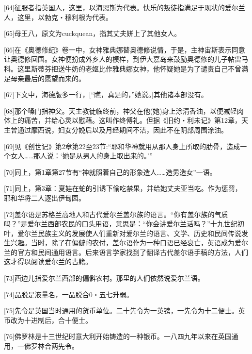 \documentclass{article}
\begin{document}
[64]征服者指英国人，这里，以海恩斯为代表。快乐的叛徒指满足于现状的爱尔兰人，这里，以勃克・穆利根为代表。



[65]母王八，原文为cuckquean，指其丈夫姘上了其他女人。



[66]在《奥德修纪》卷一中，女神雅典娜替奥德修说情，于是，主神宙斯表示同意让奥德修回国。女神便扮成外乡人的模样，到伊大嘉岛来鼓励奥德修的儿子帖雷马科。这里斯蒂芬把送牛奶的老妪比作雅典娜女神，他怀疑她是为了谴责自己不曾满足母亲最后的愿望而来的。



[67]下文中，海德版多一行，[“瞧，真是的，”她说。]其他诸本部没有。



[68]那个嗓门指神父。天主教徒临终前，神父在他(她)身上涂清香油，以便减轻肉体上的痛苦，并给心灵以慰藉。这叫作终傅礼。但据《旧约・利未记》第12章，天主曾通过摩西说，妇女分娩后以及月经期间不洁，因此不在阴部周围涂油。



[69]见《创世记》第2章第22至23节:“耶和华神就用从那人身上所取的肋骨，造成一个女人……那人说：‘她是从男人的身上取出来的。’”



[70]同上，第1章第27节有“神就照着自己的形象造人……造男造女”一语。



[71]同上，第3章：夏娃在蛇的引诱下偷吃禁果，并给她丈夫亚当吃。作为惩罚，耶和华将二人逐出伊甸园。



[72]盖尔语是苏格兰高地人和古代爱尔兰盖尔族的语言。“你有盖尔族的气质吗？”是爱尔兰西部农民的口头用语，意思是：“你会讲爱尔兰话吗？”十九世纪初叶，爱尔兰民族主义的发展使人们重新对爱尔兰的语言、文学、历史和民间传说发生兴趣。当时，除了在偏僻的农付，盖尔语作为一种口语已经衰亡，英语成为爱尔兰的官方和民间通用语言。后来语言学家找到了翻译古代盖尔语手稿的方法，人们这才得以阅读爱尔兰的古籍。



[73]西边儿指爱尔兰西部的偏僻农村。那里的人们依然说爱尔兰语。



[74]品脱是液量名，一品脱合0・五七升弱。



[75]先令是英国当时通用的货币单位。二十先令为一英镑，一先令为十二便士。英币改为十进制后，合十便士。



[76]佛罗林是十三世纪时意大利开始铸造的一种银币。一八四九年以来在英国通用，一佛罗林合两先令。
\end{document}
